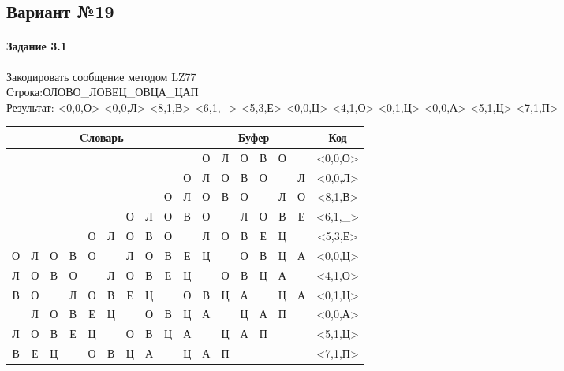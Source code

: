 \documentclass[a4paper, 12pt]{article}
\begin{document}
\pagebreak
\subsection{Вариант №19}
\paragraph{Задание 3.1}

Закодировать сообщение методом LZ77\\
Строка:ОЛОВО\_ЛОВЕЦ\_ОВЦА\_ЦАП\\
Результат: <0,0,О> <0,0,Л> <8,1,В> <6,1,\_> <5,3,Е> <0,0,Ц> <4,1,О> <0,1,Ц> <0,0,А> <5,1,Ц> <7,1,П>\\
\begin{table}[h!]
\centering
\begin{tabular}{|c|c|c|c|c|c|c|c|c|c|c|c|c|c|c|c|c|} 
\hline
\multicolumn{10}{|c|}{Cловарь} & \multicolumn{6}{c|}{Буфер} & Код  \\ \hline
  &   &   &   &   &   &   &   &   &   & \cellcolor[HTML]{8CE4F6} О & Л & О & В & О &   & <0,0,О>
\\ \hline
  &   &   &   &   &   &   &   &   & О & \cellcolor[HTML]{8CE4F6} Л & О & В & О &   & Л & <0,0,Л>
\\ \hline
  &   &   &   &   &   &   &   & \cellcolor[HTML]{FFFF00} О & Л & \cellcolor[HTML]{FFFF00} О & \cellcolor[HTML]{8CE4F6} В & О &   & Л & О & <8,1,В>
\\ \hline
  &   &   &   &   &   & \cellcolor[HTML]{FFFF00} О & Л & О & В & \cellcolor[HTML]{FFFF00} О & \cellcolor[HTML]{8CE4F6}   & Л & О & В & Е & <6,1,\_>
\\ \hline
  &   &   &   & О & \cellcolor[HTML]{FFFF00} Л & \cellcolor[HTML]{FFFF00} О & \cellcolor[HTML]{FFFF00} В & О &   & \cellcolor[HTML]{FFFF00} Л & \cellcolor[HTML]{FFFF00} О & \cellcolor[HTML]{FFFF00} В & \cellcolor[HTML]{8CE4F6} Е & Ц &   & <5,3,Е>
\\ \hline
О & Л & О & В & О &   & Л & О & В & Е & \cellcolor[HTML]{8CE4F6} Ц &   & О & В & Ц & А & <0,0,Ц>
\\ \hline
Л & О & В & О & \cellcolor[HTML]{FFFF00}   & Л & О & В & Е & Ц & \cellcolor[HTML]{FFFF00}   & \cellcolor[HTML]{8CE4F6} О & В & Ц & А &   & <4,1,О>
\\ \hline
\cellcolor[HTML]{FFFF00} В & О &   & Л & О & В & Е & Ц &   & О & \cellcolor[HTML]{FFFF00} В & \cellcolor[HTML]{8CE4F6} Ц & А &   & Ц & А & <0,1,Ц>
\\ \hline
  & Л & О & В & Е & Ц &   & О & В & Ц & \cellcolor[HTML]{8CE4F6} А &   & Ц & А & П &   & <0,0,А>
\\ \hline
Л & О & В & Е & Ц & \cellcolor[HTML]{FFFF00}   & О & В & Ц & А & \cellcolor[HTML]{FFFF00}   & \cellcolor[HTML]{8CE4F6} Ц & А & П &   &   & <5,1,Ц>
\\ \hline
В & Е & Ц &   & О & В & Ц & \cellcolor[HTML]{FFFF00} А &   & Ц & \cellcolor[HTML]{FFFF00} А & \cellcolor[HTML]{8CE4F6} П &   &   &   &   & <7,1,П>
\\ \hline
\end{tabular}
\end{table}
\end{document}
